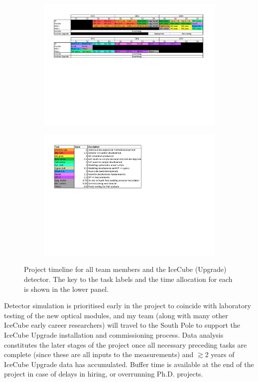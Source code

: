 \documentclass[a4paper,11pt]{article}
\begin{document}
\begin{figure}[h]
    \begin{subfigure}[c]{1.\textwidth}
    \centering
    \includegraphics[trim=1.7cm 11.1cm 1.7cm 1.0cm, clip=true, width=0.99\linewidth]{images/TaskPlanning.pdf}
    \end{subfigure}
    \begin{subfigure}[c]{1.\textwidth}
    \centering
    \includegraphics[trim=1.7cm 11.5cm 12.3cm 1.5cm, clip=true, width=0.5\linewidth]{images/TaskPlanningLegend.pdf}
    \end{subfigure}
	\caption{Project timeline for all team members and the IceCube (Upgrade) detector. The key to the task labels and the time allocation for each is shown in the lower panel.}
	\label{fig:timeline}
\end{figure}

Detector simulation is prioritised early in the project to coincide with laboratory testing of the new optical modules, and my team (along with many other IceCube early career researchers) will travel to the South Pole to support the IceCube Upgrade installation and commissioning process. Data analysis constitutes the later stages of the project once all necessary preceding tasks are complete (since these are all inputs to the measurements) and $\gtrsim$2 years of IceCube Upgrade data has accumulated. Buffer time is available at the end of the project in case of delays in hiring, or overrunning Ph.D. projects.
\end{document}
